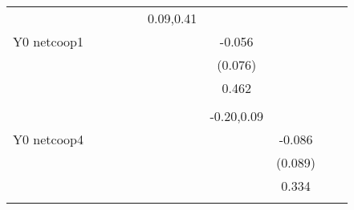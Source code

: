 \begin{table}[!h]
\begin{adjustbox}{width=\columnwidth,center}
\begin{tabular}{l*{8}{c}}
                    &                     &                     &                     &                     &   0.09,0.41         &                     &                     &                     &                     &                     \\
Y0 netcoop1         &                     &                     &                     &                     &                     &      -0.056         &                     &                     &                     &                     \\
                    &                     &                     &                     &                     &                     &     (0.076)         &                     &                     &                     &                     \\
                    &                     &                     &                     &                     &                     &       0.462         &                     &                     &                     &                     \\
                    &                     &                     &                     &                     &                     &                     &                     &                     &                     &                     \\
                    &                     &                     &                     &                     &                     &  -0.20,0.09         &                     &                     &                     &                     \\
Y0 netcoop4         &                     &                     &                     &                     &                     &                     &      -0.086         &                     &                     &                     \\
                    &                     &                     &                     &                     &                     &                     &     (0.089)         &                     &                     &                     \\
                    &                     &                     &                     &                     &                     &                     &       0.334         &                     &                     &                     \\
                    &                     &                     &                     &                     &                     &                     &                     &                     &                     &                     \\

\end{tabular}
\end{adjustbox}
\end{table}
